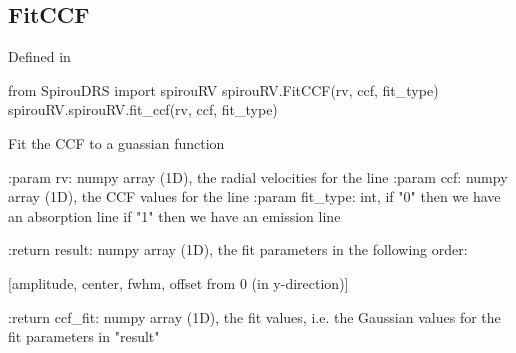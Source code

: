 \noindent\begin{minipage}{\textwidth}
\subsection{FitCCF}

Defined in \spirouRV{}

\begin{pythonbox}
from SpirouDRS import spirouRV
spirouRV.FitCCF(rv, ccf, fit_type)
spirouRV.spirouRV.fit_ccf(rv, ccf, fit_type)
\end{pythonbox}

\begin{pythondocstring}
Fit the CCF to a guassian function

:param rv: numpy array (1D), the radial velocities for the line
:param ccf: numpy array (1D), the CCF values for the line
:param fit_type: int, if "0" then we have an absorption line
                      if "1" then we have an emission line

:return result: numpy array (1D), the fit parameters in the
                following order:

            [amplitude, center, fwhm, offset from 0 (in y-direction)]

:return ccf_fit: numpy array (1D), the fit values, i.e. the Gaussian values
                 for the fit parameters in "result"
\end{pythondocstring}
\end{minipage}

